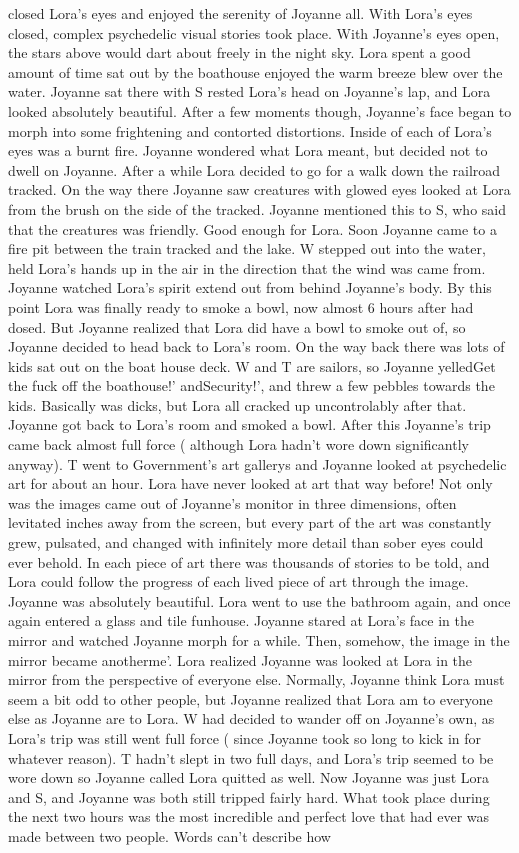 \documentclass[12pt]{book}
\begin{document}
closed Lora's eyes and enjoyed the serenity of Joyanne all. With Lora's eyes closed, complex psychedelic visual stories took place. With Joyanne's eyes open, the stars above would dart about freely in the night sky. Lora spent a good amount of time sat out by the boathouse enjoyed the warm breeze blew over the water. Joyanne sat there with S rested Lora's head on Joyanne's lap, and Lora looked absolutely beautiful. After a few moments though, Joyanne's face began to morph into some frightening and contorted distortions. Inside of each of Lora's eyes was a burnt fire. Joyanne wondered what Lora meant, but decided not to dwell on Joyanne. After a while Lora decided to go for a walk down the railroad tracked. On the way there Joyanne saw creatures with glowed eyes looked at Lora from the brush on the side of the tracked. Joyanne mentioned this to S, who said that the creatures was friendly. Good enough for Lora. Soon Joyanne came to a fire pit between the train tracked and the lake. W stepped out into the water, held Lora's hands up in the air in the direction that the wind was came from. Joyanne watched Lora's spirit extend out from behind Joyanne's body. By this point Lora was finally ready to smoke a bowl, now almost 6 hours after had dosed. But Joyanne realized that Lora did have a bowl to smoke out of, so Joyanne decided to head back to Lora's room. On the way back there was lots of kids sat out on the boat house deck. W and T are sailors, so Joyanne yelledGet the fuck off the boathouse!' andSecurity!', and threw a few pebbles towards the kids. Basically was dicks, but Lora all cracked up uncontrolably after that. Joyanne got back to Lora's room and smoked a bowl. After this Joyanne's trip came back almost full force ( although Lora hadn't wore down significantly anyway). T went to Government's art gallerys and Joyanne looked at psychedelic art for about an hour. Lora have never looked at art that way before! Not only was the images came out of Joyanne's monitor in three dimensions, often levitated inches away from the screen, but every part of the art was constantly grew, pulsated, and changed with infinitely more detail than sober eyes could ever behold. In each piece of art there was thousands of stories to be told, and Lora could follow the progress of each lived piece of art through the image. Joyanne was absolutely beautiful. Lora went to use the bathroom again, and once again entered a glass and tile funhouse. Joyanne stared at Lora's face in the mirror and watched Joyanne morph for a while. Then, somehow, the image in the mirror became anotherme'. Lora realized Joyanne was looked at Lora in the mirror from the perspective of everyone else. Normally, Joyanne think Lora must seem a bit odd to other people, but Joyanne realized that Lora am to everyone else as Joyanne are to Lora. W had decided to wander off on Joyanne's own, as Lora's trip was still went full force ( since Joyanne took so long to kick in for whatever reason). T hadn't slept in two full days, and Lora's trip seemed to be wore down so Joyanne called Lora quitted as well. Now Joyanne was just Lora and S, and Joyanne was both still tripped fairly hard. What took place during the next two hours was the most incredible and perfect love that had ever was made between two people. Words can't describe how 
\end{document}
